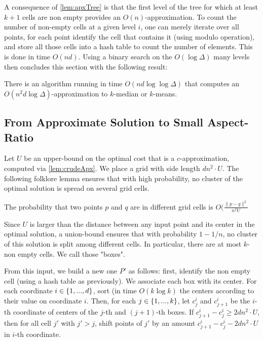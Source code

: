 A consequence of \cref{lem:apxTree} is that the first level of the tree for which at least $k+1$ cells are non empty provides an $O(n)$-approximation. 
To count the number of non-empty cells at a given level $i$, one can merely iterate over all points, for each point identify the cell that contains it (using modulo operation), and store all those cells into a hash table to count the number of elements. This is done in time $O(nd)$.
Using a binary search on the $O(\log \Delta)$ many levels then concludes this section with the following result:

\begin{lemma}\label{lem:crudeApx}
There is an algorithm running in time $O(nd \log \log \Delta)$ that computes an  $O(n^2 d \log \Delta)$-approximation to $k$-median or $k$-means.
\end{lemma}

\subsection{From Approximate Solution to Small Aspect-Ratio}
Let $U$ be an upper-bound on the optimal cost that is a $c$-approximation, computed via \cref{lem:crudeApx}. We place a grid with side length $d n^2\cdot U$.
The following folklore lemma ensures that with high probability, no cluster of the optimal solution is spread on several grid cells.

\begin{lemma}
The probability that two points $p$ and $q$ are in different grid cells is $O(\frac{\|p-q\|^2}{n^2 U}$
\end{lemma}
Since $U$ is larger than the distance between any input point and its center in the optimal solution, a union-bound ensures that with probability $1-1/n$, no cluster of this solution is split among different cells.
In particular, there are at most $k$-non empty cells. We call those "boxes".

From this input, we build a new one $P'$ as follows: first, identify the non empty cell (using a hash table as previously). We associate each box with its center.
For each coordinate $i \in \left\{ 1, ..., d \right\}$, sort (in time $O(k \log k)$ the centers according to their value on coordinate $i$. Then, for each $j \in \left\{ 1, ..., k\right\}$, let $c^i_j$ and $c^i_{j+1}$ be the $i$-th coordinate of centers of the $j$-th and $(j+1)$-th boxes. If $c^i_{j+1} - c^i_j \geq 2d n^2\cdot U$, then for all cell $j'$ with $j' > j$, shift points  of $j'$ by an amount $c^i_{j+1} - c^i_j - 2d n^2\cdot U$ in $i$-th coordinate.


